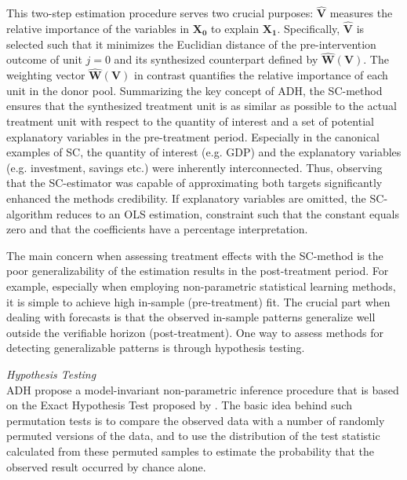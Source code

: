 This two-step estimation procedure serves two crucial purposes: $\widehat{\boldsymbol{V}}$ measures the relative importance of the variables in $\boldsymbol{X_0}$ to explain $\boldsymbol{X_1}$. Specifically, $\widehat{\boldsymbol{V}}$ is selected such that it minimizes the Euclidian distance of the pre-intervention outcome of unit $j = 0$ and its synthesized counterpart defined by $\widehat{\boldsymbol{W}}(\boldsymbol{V})$. The weighting vector $\widehat{\boldsymbol{W}}(\boldsymbol{V})$ in contrast quantifies the relative importance of each unit in the donor pool. Summarizing the key concept of \ac{ADH}, the \ac{SC}-method ensures that the synthesized treatment unit is as similar as possible to the actual treatment unit with respect to the quantity of interest and a set of potential explanatory variables in the pre-treatment period. Especially in the canonical examples of \ac{SC}, the quantity of interest (e.g. \ac{GDP}) and the explanatory variables (e.g. investment, savings etc.) were inherently interconnected. Thus, observing that the \ac{SC}-estimator was capable of approximating both targets significantly enhanced the methods credibility. If explanatory variables are omitted, the \ac{SC}-algorithm reduces to an \ac{OLS} estimation, constraint such that the constant equals zero and that the coefficients have a percentage interpretation.

The main concern when assessing treatment effects with the \ac{SC}-method is the poor 
generalizability of the estimation results in the post-treatment period. For example, especially when employing non-parametric statistical learning methods, it is simple to achieve high in-sample (pre-treatment) fit. The crucial part when dealing with forecasts is that the observed in-sample patterns generalize well outside the verifiable horizon (post-treatment). One way to assess methods for detecting generalizable patterns is through hypothesis testing.

\textit{Hypothesis Testing} \\
\ac{ADH} propose a model-invariant non-parametric inference procedure that is based on the Exact Hypothesis Test proposed by \cite{fisher:1971}. The basic idea behind such permutation tests is to compare the observed data with a number of randomly permuted versions of the data, and to use the distribution of the test statistic calculated from these permuted samples to estimate the probability that the observed result occurred by chance alone. 

